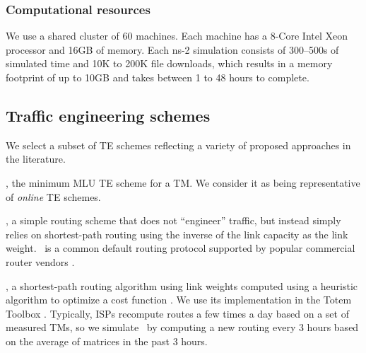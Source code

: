 \subsubsection{Computational resources}
We use a shared cluster of 60 machines. Each machine has a 8-Core Intel Xeon processor and 16GB of memory. Each ns-2 simulation consists of 300--500s of simulated time and 10K to 200K file downloads, which results in a memory footprint of up to 10GB and takes between 1 to 48 hours to complete.

\subsection{Traffic engineering schemes} We select a subset of TE schemes reflecting a variety of proposed approaches in the literature.

{\bf{\opt}}, the minimum MLU TE scheme for a TM. We consider it as being representative of {\em online} TE schemes.


{\bf{\invcap}}, a simple routing scheme that does not ``engineer'' traffic, but instead  simply relies on shortest-path routing using the inverse of the link capacity as the link weight. \invcap\ is a common default routing protocol supported by popular commercial router vendors \cite{InvCapCite}.

{\bf{\optwt}},  a shortest-path routing algorithm using link weights computed using a heuristic algorithm to optimize a cost function \cite{fortz2000internet}. We use its implementation in the Totem Toolbox \cite{TotemData}. Typically, ISPs recompute routes a few times a day based on a set of measured TMs, so we simulate \optwt\ by computing a new routing every 3 hours based on the average of matrices in the past 3 hours.


